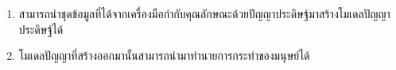 \begin{enumerate}
	\item สามารถนำชุดข้อมูลที่ได้จากเครื่องมือกำกับคุณลักษณะด้วยปัญญาประดิษฐ์มาสร้างโมเดลปัญญาประดิษฐ์ได้
	\item โมเดลปัญญาที่สร้างออกมานั้นสามารถนำมาทำนายการกระทำของมนุษย์ได้
\end{enumerate}